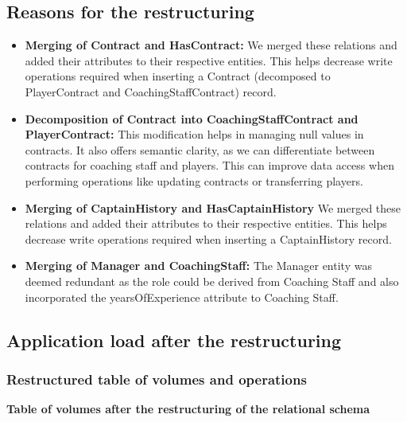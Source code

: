 \subsection{Reasons for the restructuring}
\begin{itemize}
 \item \textbf{Merging of Contract and HasContract:} 
\newline We merged these relations and added their attributes to their respective entities. This helps decrease write operations required when inserting a Contract (decomposed to PlayerContract and CoachingStaffContract) record.
  \item \textbf{Decomposition of Contract into CoachingStaffContract and PlayerContract:} 
\newline This modification helps in managing null values in contracts. It also offers semantic clarity, as we can differentiate between contracts for coaching staff and players. This can improve data access when performing operations like updating contracts or transferring players.
    \item \textbf{Merging of CaptainHistory and HasCaptainHistory } 
\newline We merged these relations and added their attributes to their respective entities. This helps decrease write operations required when inserting a CaptainHistory record.
 \item \textbf{Merging of Manager and CoachingStaff:} 
\newline The Manager entity was deemed redundant as the role could be derived from Coaching Staff and also incorporated the yearsOfExperience attribute to Coaching Staff.
  
\end{itemize}

\pagebreak

\subsection{Application load after the restructuring}

\subsubsection{Restructured table of volumes and operations}

\vspace{12px}

{\centering \textbf{Table of volumes after the restructuring of the relational schema}\\}

